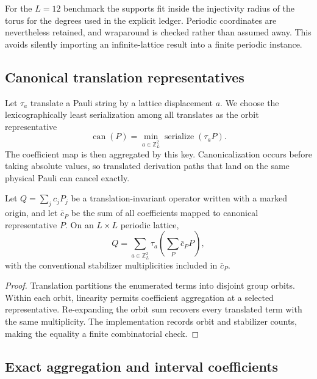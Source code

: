 For the $L=12$ benchmark the supports fit inside the injectivity radius of the
torus for the degrees used in the explicit ledger.  Periodic coordinates are
nevertheless retained, and wraparound is checked rather than assumed away.
This avoids silently importing an infinite-lattice result into a finite
periodic instance.

\subsection{Canonical translation representatives}

Let $\tau_a$ translate a Pauli string by a lattice displacement $a$.  We
choose the lexicographically least serialization among all translates as the
orbit representative
\begin{equation}
  \operatorname{can}(P)=\min_{a\in\mathbb Z_L^2}\operatorname{serialize}(\tau_aP).
  \label{eq:translation-canonical}
\end{equation}
The coefficient map is then aggregated by this key.  Canonicalization occurs
before taking absolute values, so translated derivation paths that land on the
same physical Pauli can cancel exactly.

\begin{proposition}
\label{prop:translation}
Let $Q=\sum_jc_jP_j$ be a translation-invariant operator written with a marked
origin, and let $\bar c_P$ be the sum of all coefficients mapped to canonical
representative $P$.  On an $L\times L$ periodic lattice,
\begin{equation}
  Q=\sum_{a\in\mathbb Z_L^2}\tau_a
      \left(\sum_{P}\bar c_P P\right),
\end{equation}
with the conventional stabilizer multiplicities included in $\bar c_P$.
\end{proposition}

\begin{proof}
Translation partitions the enumerated terms into disjoint group orbits.
Within each orbit, linearity permits coefficient aggregation at a selected
representative.  Re-expanding the orbit sum recovers every translated term
with the same multiplicity.  The implementation records orbit and stabilizer
counts, making the equality a finite combinatorial check.
\end{proof}

\subsection{Exact aggregation and interval coefficients}

